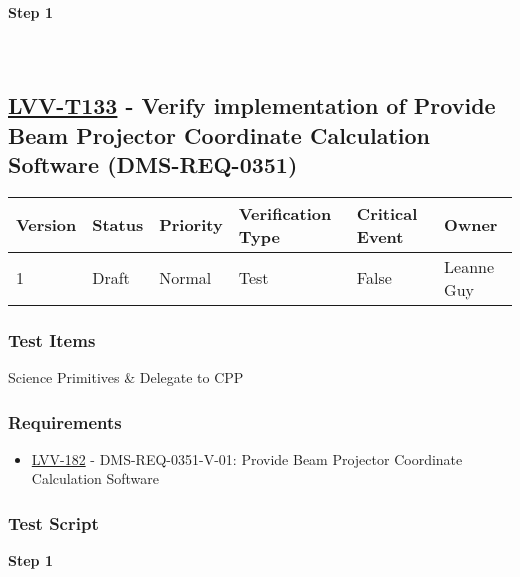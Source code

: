 \textbf{Step 1}\\
~\\
~\\

\hypertarget{lvv-t133---verify-implementation-of-provide-beam-projector-coordinate-calculation-software-dms-req-0351}{%
\subsection{\texorpdfstring{\href{https://jira.lsstcorp.org/secure/Tests.jspa\#/testCase/LVV-T133}{LVV-T133}
- Verify implementation of Provide Beam Projector Coordinate Calculation
Software
(DMS-REQ-0351)}{LVV-T133 - Verify implementation of Provide Beam Projector Coordinate Calculation Software (DMS-REQ-0351)}}\label{lvv-t133---verify-implementation-of-provide-beam-projector-coordinate-calculation-software-dms-req-0351}}

\begin{longtable}[]{@{}llllll@{}}
\toprule
Version & Status & Priority & Verification Type & Critical Event &
Owner\tabularnewline
\midrule
\endhead
1 & Draft & Normal & Test & False & Leanne Guy\tabularnewline
\bottomrule
\end{longtable}

\hypertarget{test-items-33}{%
\subsubsection{Test Items}\label{test-items-33}}

Science Primitives \& Delegate to CPP

\hypertarget{requirements-33}{%
\subsubsection{Requirements}\label{requirements-33}}

\begin{itemize}
\tightlist
\item
  \href{https://jira.lsstcorp.org/browse/LVV-182}{LVV-182} -
  DMS-REQ-0351-V-01: Provide Beam Projector Coordinate Calculation
  Software
\end{itemize}

\hypertarget{test-script-33}{%
\subsubsection{Test Script}\label{test-script-33}}

\textbf{Step 1}\\
~\\
~\\

